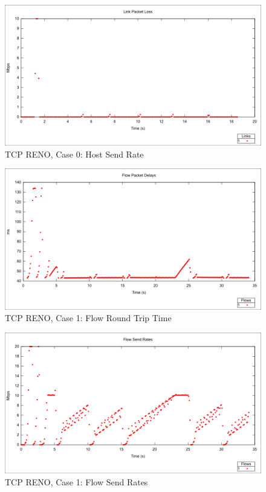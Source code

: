 \begin{figure}[htbp]
    \centering
    \includegraphics[width=\textwidth]{reno0/Link_Packet_Loss.png}
    \caption{TCP RENO, Case 0: Host Send Rate}
\end{figure}

\newpage
\clearpage


\begin{figure}[htbp]
    \centering
    \includegraphics[width=\textwidth]{reno1/Flow_RTT.png}
    \caption{TCP RENO, Case 1: Flow Round Trip Time}
\end{figure}

\begin{figure}[htbp]
    \centering
    \includegraphics[width=\textwidth]{reno1/Flow_Send_Rates.png}
    \caption{TCP RENO, Case 1: Flow Send Rates}
\end{figure}

